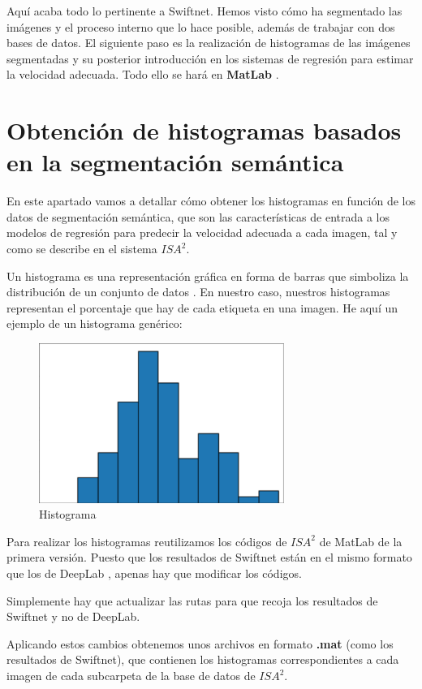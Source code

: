 Aquí acaba todo lo pertinente a Swiftnet. Hemos visto cómo ha segmentado las imágenes y el proceso interno que lo hace posible, además de trabajar con dos bases de datos. El siguiente paso es la realización de histogramas de las imágenes segmentadas y su posterior introducción en los sistemas de regresión para estimar la velocidad adecuada. Todo ello se hará en \textbf{MatLab} \cite{matlab}.

\section{Obtención de histogramas basados en la segmentación semántica}

En este apartado vamos a detallar cómo obtener los histogramas en función de los datos de segmentación semántica, que son las características de entrada a los modelos de regresión para predecir la velocidad adecuada a cada imagen, tal y como se describe en el sistema $ISA^2$.

Un histograma es una representación gráfica en forma de barras que simboliza la distribución de un conjunto de datos \cite{histograma}. En nuestro caso, nuestros histogramas representan el porcentaje que hay de cada etiqueta en una imagen. He aquí un ejemplo de un histograma genérico:

\begin{figure}[H]
  \centering
  \includegraphics[width=8cm]{Figuras/histograma.eps}
  \caption{Histograma}
\end{figure}

Para realizar los histogramas reutilizamos los códigos de $ISA^{2}$ \cite{isa2} de MatLab de la primera versión. Puesto que los resultados de Swiftnet están en el mismo formato que los de DeepLab \cite{deeplab}, apenas hay que modificar los códigos.

Simplemente hay que actualizar las rutas para que recoja los resultados de Swiftnet y no de DeepLab.

Aplicando estos cambios obtenemos unos archivos en formato \textbf{.mat} (como los resultados de Swiftnet), que contienen los histogramas correspondientes a cada imagen de cada subcarpeta de la base de datos de $ISA^{2}$.

